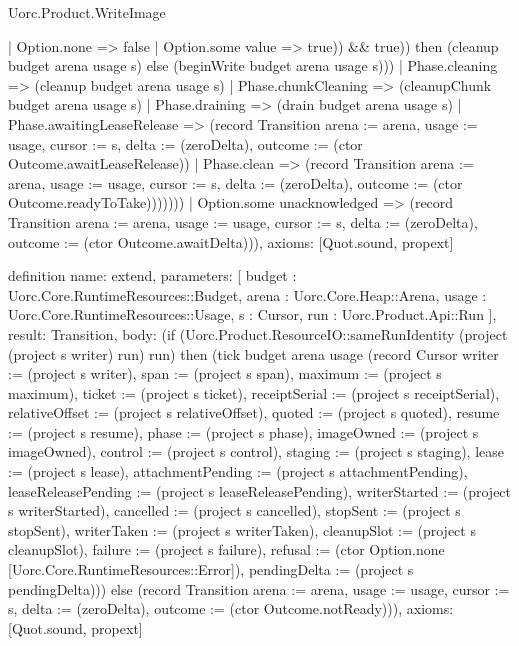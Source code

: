 \begin{lexlean}{Uorc.Product.WriteImage}
\begin{semanticmodule}
{        | Option.none => false
        | Option.some value => true)) && true)) then (cleanup budget arena usage s) else (beginWrite budget arena usage s)))
      | Phase.cleaning => (cleanup budget arena usage s)
      | Phase.chunkCleaning => (cleanupChunk budget arena usage s)
      | Phase.draining => (drain budget arena usage s)
      | Phase.awaitingLeaseRelease => (record Transition {arena := arena, usage := usage, cursor := s, delta := (zeroDelta), outcome := (ctor Outcome.awaitLeaseRelease)})
      | Phase.clean => (record Transition {arena := arena, usage := usage, cursor := s, delta := (zeroDelta), outcome := (ctor Outcome.readyToTake)}))))))
    | Option.some unacknowledged => (record Transition {arena := arena, usage := usage, cursor := s, delta := (zeroDelta), outcome := (ctor Outcome.awaitDelta)})),
  axioms: [Quot.sound, propext]
}

definition{
  name: extend,
  parameters: [
    budget : Uorc.Core.RuntimeResources::Budget,
    arena : Uorc.Core.Heap::Arena,
    usage : Uorc.Core.RuntimeResources::Usage,
    s : Cursor,
    run : Uorc.Product.Api::Run
  ],
  result: Transition,
  body: (if (Uorc.Product.ResourceIO::sameRunIdentity (project (project s writer) run) run) then (tick budget arena usage (record Cursor {writer := (project s writer), span := (project s span), maximum := (project s maximum), ticket := (project s ticket), receiptSerial := (project s receiptSerial), relativeOffset := (project s relativeOffset), quoted := (project s quoted), resume := (project s resume), phase := (project s phase), imageOwned := (project s imageOwned), control := (project s control), staging := (project s staging), lease := (project s lease), attachmentPending := (project s attachmentPending), leaseReleasePending := (project s leaseReleasePending), writerStarted := (project s writerStarted), cancelled := (project s cancelled), stopSent := (project s stopSent), writerTaken := (project s writerTaken), cleanupSlot := (project s cleanupSlot), failure := (project s failure), refusal := (ctor Option.none [Uorc.Core.RuntimeResources::Error]), pendingDelta := (project s pendingDelta)})) else (record Transition {arena := arena, usage := usage, cursor := s, delta := (zeroDelta), outcome := (ctor Outcome.notReady)})),
  axioms: [Quot.sound, propext]
}
\end{semanticmodule}
\end{lexlean}
